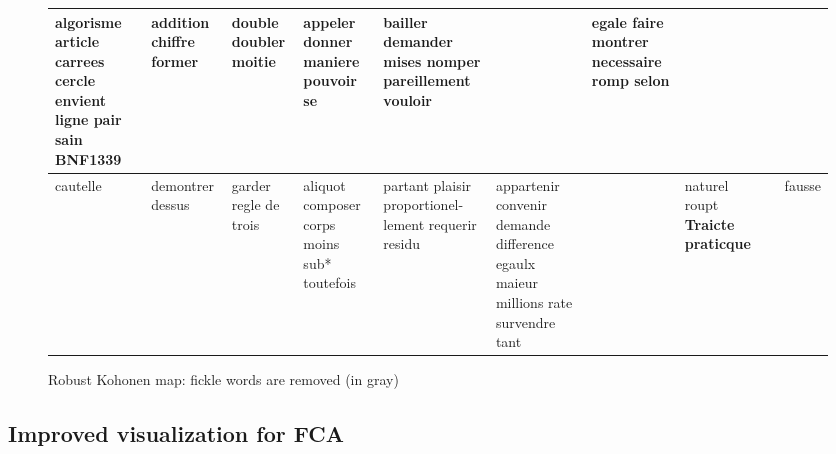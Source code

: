 \documentclass[preprint]{elsarticle}
\begin{document}
\begin{figure}[ht!]
{\begin{tabular}{|p{1.9cm}|p{1.9cm}|p{1.9cm}|p{1.9cm}|p{1.9cm}|p{1.9cm}|p{1.9cm}|p{1.9cm}|p{1.9cm}|p{1.9cm}|}
\hline
algorisme article carrees cercle envient ligne pair sain \textbf{BNF1339} & addition chiffre former &  \textcolor{gris}{double}  \textcolor{gris}{doubler} moitie & appeler  \textcolor{gris}{donner}  \textcolor{gris}{maniere}  \textcolor{gris}{pouvoir}  \textcolor{gris}{se}& bailler demander mises nomper pareillement vouloir & & egale faire montrer necessaire romp selon & & & \\
\hline
cautelle & demontrer dessus &  \textcolor{gris}{garder}  \textcolor{gris}{regle}  \textcolor{gris}{de}  \textcolor{gris}{trois} & aliquot composer corps moins sub* toutefois & partant plaisir proportionel- lement requerir residu & appartenir convenir demande difference egaulx maieur millions rate survendre tant & & naturel roupt \textbf{Traicte praticque} & & fausse\\
\hline
\end{tabular}
}
\caption{Robust Kohonen map: fickle words are removed (in gray)}
\label{fig:koho3}
\end{figure}

\subsection{Improved visualization for FCA}
\end{document}
